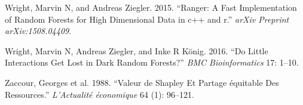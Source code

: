 \documentclass[
]{article}
\newlength{\cslhangindent}
\newlength{\cslentryspacingunit} %
\newenvironment{CSLReferences}[2] %
 {%
  \setlength{\parindent}{0pt}
  \ifodd #1
  \let\oldpar\par
  \def\par{\hangindent=\cslhangindent\oldpar}
  \fi
  \setlength{\parskip}{#2\cslentryspacingunit}
 }%
 {}
\begin{document}
\begin{CSLReferences}{1}{0}
\leavevmode{}%
Wright, Marvin N, and Andreas Ziegler. 2015. {``Ranger: A Fast
Implementation of Random Forests for High Dimensional Data in c++ and
r.''} \emph{arXiv Preprint arXiv:1508.04409}.

\leavevmode{}%
Wright, Marvin N, Andreas Ziegler, and Inke R König. 2016. {``Do Little
Interactions Get Lost in Dark Random Forests?''} \emph{BMC
Bioinformatics} 17: 1--10.

\leavevmode{}%
Zaccour, Georges et al. 1988. {``Valeur de Shapley Et Partage
{é}quitable Des Ressources.''} \emph{L'Actualit{é} {é}conomique} 64 (1):
96--121.

\end{CSLReferences}
\end{document}
